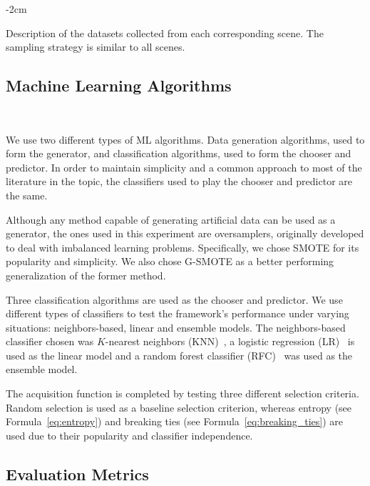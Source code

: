 \documentclass[preprint,12pt]{elsarticle}
\begin{document}
\begin{table}
    \centering
    \addtolength{\leftskip} {-2cm}
    \addtolength{\rightskip}{-2cm}
    \caption{\label{tab:datasets_description}
        Description of the datasets collected from each corresponding scene.
        The sampling strategy is similar to all scenes.
    }
\end{table}

\subsection{Machine Learning Algorithms}~\label{sec:machine_learning_algorithms}

We use two different types of ML algorithms. Data generation algorithms, used
to form the generator, and classification algorithms, used to form the chooser
and predictor. In order to maintain simplicity and a common approach to most of
the literature in the topic, the classifiers used to play the chooser and
predictor are the same.

Although any method capable of generating artificial data can be used as a
generator, the ones used in this experiment are oversamplers, originally
developed to deal with imbalanced learning problems. Specifically, we chose
SMOTE for its popularity and simplicity. We also chose G-SMOTE as a better
performing generalization of the former method.

Three classification algorithms are used as the chooser and predictor. We use
different types of classifiers to test the framework's performance under
varying situations: neighbors-based, linear and ensemble models. The
neighbors-based classifier chosen was $K$-nearest neighbors
(KNN)~\cite{Cover1967}, a logistic regression (LR)~\cite{Nelder1972} is used as
the linear model and a random forest classifier (RFC)~\cite{Ho1995} was used as
the ensemble model.

The acquisition function is completed by testing three different selection
criteria. Random selection is used as a baseline selection criterion, whereas
entropy (see Formula~\ref{eq:entropy}) and breaking ties (see
Formula~\ref{eq:breaking_ties}) are used due to their popularity and classifier
independence. 

\subsection{Evaluation Metrics}~\label{sec:evaluation_metrics}
\end{document}

